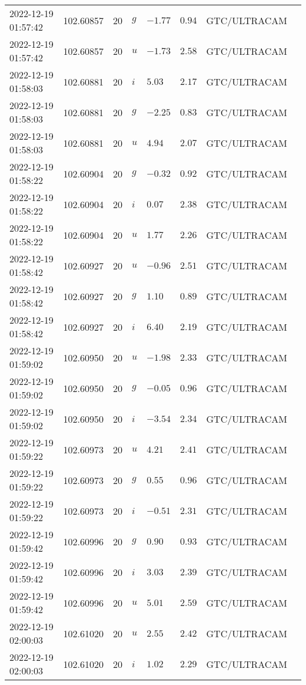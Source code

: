 \documentclass{nature_plusfigure}
\begin{document}
\begin{supplement}
\begin{center}
\begin{longtable}{llllllll}
2022-12-19 01:57:42 & 102.60857 & 20 & $g$ & $-1.77$ & $0.94$ & GTC/ULTRACAM &  \\ 
2022-12-19 01:57:42 & 102.60857 & 20 & $u$ & $-1.73$ & $2.58$ & GTC/ULTRACAM &  \\ 
2022-12-19 01:58:03 & 102.60881 & 20 & $i$ & $5.03$ & $2.17$ & GTC/ULTRACAM &  \\ 
2022-12-19 01:58:03 & 102.60881 & 20 & $g$ & $-2.25$ & $0.83$ & GTC/ULTRACAM &  \\ 
2022-12-19 01:58:03 & 102.60881 & 20 & $u$ & $4.94$ & $2.07$ & GTC/ULTRACAM &  \\ 
2022-12-19 01:58:22 & 102.60904 & 20 & $g$ & $-0.32$ & $0.92$ & GTC/ULTRACAM &  \\ 
2022-12-19 01:58:22 & 102.60904 & 20 & $i$ & $0.07$ & $2.38$ & GTC/ULTRACAM &  \\ 
2022-12-19 01:58:22 & 102.60904 & 20 & $u$ & $1.77$ & $2.26$ & GTC/ULTRACAM &  \\ 
2022-12-19 01:58:42 & 102.60927 & 20 & $u$ & $-0.96$ & $2.51$ & GTC/ULTRACAM &  \\ 
2022-12-19 01:58:42 & 102.60927 & 20 & $g$ & $1.10$ & $0.89$ & GTC/ULTRACAM &  \\ 
2022-12-19 01:58:42 & 102.60927 & 20 & $i$ & $6.40$ & $2.19$ & GTC/ULTRACAM &  \\ 
2022-12-19 01:59:02 & 102.60950 & 20 & $u$ & $-1.98$ & $2.33$ & GTC/ULTRACAM &  \\ 
2022-12-19 01:59:02 & 102.60950 & 20 & $g$ & $-0.05$ & $0.96$ & GTC/ULTRACAM &  \\ 
2022-12-19 01:59:02 & 102.60950 & 20 & $i$ & $-3.54$ & $2.34$ & GTC/ULTRACAM &  \\ 
2022-12-19 01:59:22 & 102.60973 & 20 & $u$ & $4.21$ & $2.41$ & GTC/ULTRACAM &  \\ 
2022-12-19 01:59:22 & 102.60973 & 20 & $g$ & $0.55$ & $0.96$ & GTC/ULTRACAM &  \\ 
2022-12-19 01:59:22 & 102.60973 & 20 & $i$ & $-0.51$ & $2.31$ & GTC/ULTRACAM &  \\ 
2022-12-19 01:59:42 & 102.60996 & 20 & $g$ & $0.90$ & $0.93$ & GTC/ULTRACAM &  \\ 
2022-12-19 01:59:42 & 102.60996 & 20 & $i$ & $3.03$ & $2.39$ & GTC/ULTRACAM &  \\ 
2022-12-19 01:59:42 & 102.60996 & 20 & $u$ & $5.01$ & $2.59$ & GTC/ULTRACAM &  \\ 
2022-12-19 02:00:03 & 102.61020 & 20 & $u$ & $2.55$ & $2.42$ & GTC/ULTRACAM &  \\ 
2022-12-19 02:00:03 & 102.61020 & 20 & $i$ & $1.02$ & $2.29$ & GTC/ULTRACAM &  \\ 

\end{longtable}
\end{center}
\end{supplement}
\end{document}
